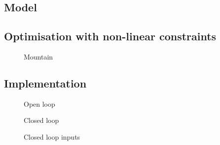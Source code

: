 \documentclass[11pt, a4paper, USenglish]{article} %
\begin{document}
\subsection{Model} %
\label{sub:model}

\subsection{Optimisation with non-linear constraints} %
\label{sub:optimisation_with_non_linear_constraints}
\begin{figure}[H] 
        \centering
        \setlength{\figureheight}{6cm}
        \setlength{\figurewidth}{10cm}
        
        \caption{Mountain} 
\label{fig:ex4_3_mountain} 
\end{figure}


\subsection{Implementation} %
\label{sub:implementation}
\begin{figure}[H] 
        \centering
        \setlength{\figureheight}{6cm}
        \setlength{\figurewidth}{10cm}
        
        \caption{Open loop} 
\label{fig:ex4_4_open_loop} 
\end{figure}

\begin{figure}[H] 
        \centering
        \setlength{\figureheight}{6cm}
        \setlength{\figurewidth}{10cm}
        
        \caption{Closed loop} 
\label{fig:ex4_4_open_loop} 
\end{figure}

\begin{figure}[H] 
        \centering
        \setlength{\figureheight}{6cm}
        \setlength{\figurewidth}{10cm}
        
        \caption{Closed loop inputs} 
\label{fig:ex4_4_CL_input} 
\end{figure}

\begin{figure}[H] 
        \centering
        \setlength{\figureheight}{6cm}
        \setlength{\figurewidth}{10cm}
        
        \caption{} 
\label{fig:figure} {}
\end{figure}
\end{document}
